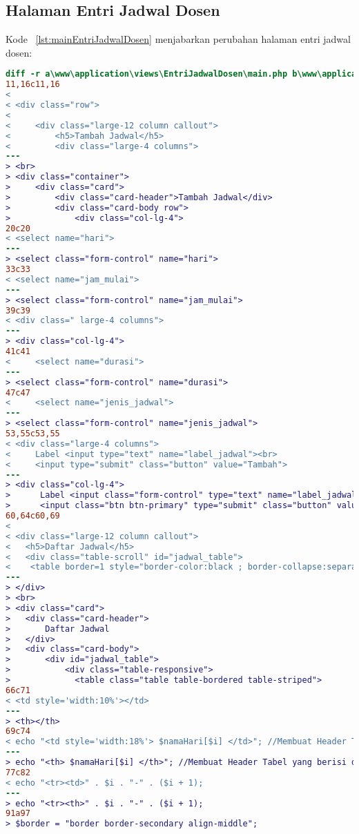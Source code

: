\subsection{Halaman Entri Jadwal Dosen}
Kode ~\ref{lst:mainEntriJadwalDosen} menjabarkan perubahan halaman entri jadwal dosen:
\begin{lstlisting}[language=diff, caption=Kode untuk Halaman Entri Jadwal Dosen,  basicstyle=\ttfamily, frame=single,
columns=fullflexible, keepspaces=true, breaklines=true, label={lst:mainEntriJadwalDosen}]
diff -r a\www\application\views\EntriJadwalDosen\main.php b\www\application\views\EntriJadwalDosen\main.php
11,16c11,16
< 
< <div class="row">
< 
<     <div class="large-12 column callout">
<         <h5>Tambah Jadwal</h5>
<         <div class="large-4 columns">
---
> <br>
> <div class="container">
>     <div class="card">
>         <div class="card-header">Tambah Jadwal</div>
>         <div class="card-body row">
>             <div class="col-lg-4">
20c20
< <select name="hari"> 
---
> <select class="form-control" name="hari">
33c33
< <select name="jam_mulai"> 
---
> <select class="form-control" name="jam_mulai">
39c39
< <div class=" large-4 columns">
---
> <div class="col-lg-4">
41c41
<     <select name="durasi"> 
---
> <select class="form-control" name="durasi">
47c47
<     <select name="jenis_jadwal"> 
---
> <select class="form-control" name="jenis_jadwal">
53,55c53,55
< <div class="large-4 columns">
<     Label <input type="text" name="label_jadwal"><br>
<     <input type="submit" class="button" value="Tambah">
---
> <div class="col-lg-4">
>      Label <input class="form-control" type="text" name="label_jadwal"><br><br>
>      <input class="btn btn-primary" type="submit" class="button" value="Tambah" class="btn btn-primary">
60,64c60,69
< 
< <div class="large-12 column callout">
< 	<h5>Daftar Jadwal</h5>
< 	<div class="table-scroll" id="jadwal_table">
< 	 <table border=1 style="border-color:black ; border-collapse:separate">
---
> </div>
> <br>
> <div class="card">
> 	<div class="card-header">
> 	    Daftar Jadwal
> 	</div>
> 	<div class="card-body">
> 	    <div id="jadwal_table">
> 	        <div class="table-responsive">
>             <table class="table table-bordered table-striped">
66c71
< <td style='width:10%'></td>
---
> <th></th>
69c74
< echo "<td style='width:18%'> $namaHari[$i] </td>"; //Membuat Header Tabel yang berisi daftar hari
---
> echo "<th> $namaHari[$i] </th>"; //Membuat Header Tabel yang berisi daftar hari
77c82
< echo "<tr><td>" . $i . "-" . ($i + 1);
---
> echo "<tr><th>" . $i . "-" . ($i + 1);
91a97
> $border = "border border-secondary align-middle";

\end{lstlisting}
